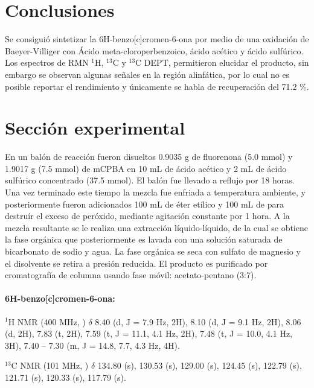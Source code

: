 \documentclass[fleqn,11pt]{SelfArx}
\begin{document}
	\section{Conclusiones}
	Se consiguió sintetizar la 6H-benzo[c]cromen-6-ona por medio de una oxidación de Baeyer-Villiger con Ácido meta-cloroperbenzoico, ácido acético y ácido sulfúrico. Los espectros de RMN $^1$H, $^{13}$C y $^{13}$C DEPT, permitieron elucidar el producto, sin embargo se observan algunas señales en la región alinfática, por lo cual no es posible reportar el rendimiento y únicamente se habla de recuperación del 71.2 \%. 
	\section{Secci\'on experimental}
	En un balón de reacción fueron disueltos 0.9035 g de fluorenona (5.0 mmol) y 1.9017 g (7.5 mmol) de mCPBA en 10 mL de ácido acético y 2 mL de ácido sulfúrico concentrado (37.5 mmol). El balón fue llevado a reflujo por 18 horas. Una vez terminado este tiempo la mezcla fue enfriada a temperatura ambiente, y posteriormente fueron adicionados 100 mL de éter etílico y 100 mL de  para destruír el exceso de peróxido, mediante agitación constante por 1 hora. A la mezcla resultante se le realiza una extracción líquido-líquido, de la cual se obtiene la fase orgánica que posteriormente es lavada con una solución saturada de bicarbonato de sodio y agua. La fase orgánica se seca con sulfato de magnesio y el disolvente se retira a presión reducida. El producto es purificado por cromatografía de columna usando fase móvil: acetato-pentano (3:7).
	\paragraph{6H-benzo[c]cromen-6-ona:}
	$^1$H NMR (400 MHz, ) $\delta$ 8.40 (d, J = 7.9 Hz, 2H), 8.10 (d, J = 9.1 Hz, 2H), 8.06 (d, 2H), 7.83 (t, 2H), 7.59 (t, J = 11.1, 4.1 Hz, 2H), 7.48 (t, J = 10.0, 4.1 Hz, 3H), 7.40 – 7.30 (m, J = 14.8, 7.7, 4.3 Hz, 4H).
	
	$^{13}$C NMR (101 MHz, ) $\delta$ 134.80 (s), 130.53 (s), 129.00 (s), 124.45 (s), 122.79 (s), 121.71 (s), 120.33 (s), 117.79 (s).
	
	
	
	
	
\end{document}
